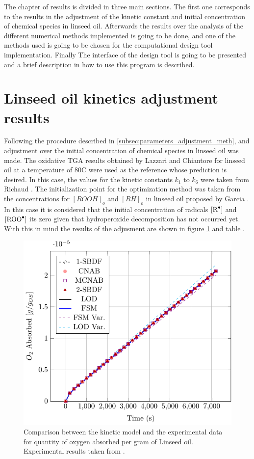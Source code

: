 \begin{refsection}
The chapter of results is divided in three main sections. The first one corresponds to the results in the adjustment of the kinetic constant and initial concentration of chemical species in linseed oil. Afterwards  the results over the analysis of the different numerical methods implemented is going to be done, and one of the methods used is going to be chosen for the computational design tool implementation. Finally The interface of the design tool is going to be presented and a brief description in how to use this program is described.  


\section{Linseed oil kinetics adjustment results}
Following the procedure described in \ref{subsec:parameters_adjustment_meth}, and adjustment over the initial concentration of chemical species in linseed oil was made.  The oxidative TGA results obtained by  Lazzari and Chiantore \cite{lazzari1999drying}  for linseed oil at a temperature of 80\degree C were used as the reference whose prediction is desired. In this case, the values for the kinetic constants $k_1$  to $k_6$  were taken from Richaud \cite{Richaud2012RateChemiluminescence}. The initialization point for the optimization method was taken from the concentrations for $[ROOH]_o$ and  $[RH]_o$  in linseed oil proposed by Garcia \cite{GarciaMora2015KineticScavengers}. In this case it is considered that the initial concentration of radicals $[\ce{R^.}]$ and $[\ce{ROO^.}]$ its zero given that hydroperoxide decomposition has not occurred yet. With this in mind the results of the adjusment are shown in figure \ref{fig:ajuste_1_cinetica} and table .

\begin{figure}[H]
    \centering
    \includegraphics[width=0.56\linewidth,page=4]{Documento_Latex/Tesis_1/Imagenes/rozogafas.pdf}
    \caption{Comparison between the kinetic model and the experimental data for quantity of oxygen absorbed per gram of Linseed oil. Experimental results taken from \cite{lazzari1999drying}.}
    \label{fig:ajuste_1_cinetica}
\end{figure}


\end{refsection}
